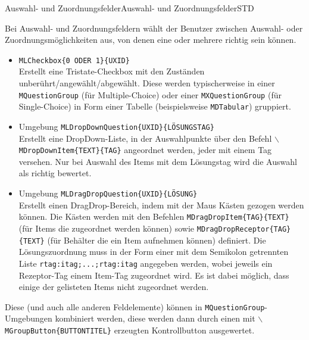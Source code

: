 
\begin{MXContent}{Auswahl- und Zuordnungsfelder}{Auswahl- und Zuordnungsfelder}{STD}

\begin{MInfo}
Bei Auswahl- und Zuordnungsfeldern wählt der Benutzer zwischen Auswahl- oder Zuordnungsmöglichkeiten aus, von denen eine oder mehrere richtig sein können.
\ \\
\begin{itemize}
\item{\texttt{MLCheckbox\{0 ODER 1\}\{UXID\}}\\
Erstellt eine Tristate-Checkbox mit den Zuständen unberührt/angewählt/abgewählt. Diese werden typischerweise in einer \texttt{MQuestionGroup} (für Multiple-Choice)
oder einer \texttt{MXQuestionGroup} (für Single-Choice) in Form einer Tabelle (beispielsweise \texttt{MDTabular}) gruppiert.}
\item{Umgebung \texttt{MLDropDownQuestion\{UXID\}\{LÖSUNGSTAG\}}\\
Erstellt eine DropDown-Liste, in der Auswahlpunkte über den Befehl \texttt{$\backslash$MDropDownItem\{TEXT\}\{TAG\}} angeordnet werden, jeder mit einem Tag versehen.
Nur bei Auswahl des Items mit dem Lösungstag wird die Auswahl als richtig bewertet.}
\item{Umgebung \texttt{MLDragDropQuestion\{UXID\}\{LÖSUNG\}}\\
Erstellt einen DragDrop-Bereich, indem mit der Maus Kästen gezogen werden können.
Die Kästen werden mit den Befehlen \texttt{MDragDropItem\{TAG\}\{TEXT\}} (für Items die zugeordnet werden können) sowie
\texttt{MDragDropReceptor\{TAG\}\{TEXT\}} (für Behälter die ein Item aufnehmen können) definiert.
Die Lösungszuordnung muss in der Form einer mit dem Semikolon getrennten Liste \texttt{rtag:itag;...;rtag:itag} angegeben werden,
wobei jeweils ein Rezeptor-Tag einem Item-Tag zugeordnet wird. Es ist dabei möglich, dass einige der gelisteten Items nicht zugeordnet werden.}
\end{itemize}

Diese (und auch alle anderen Feldelemente) können in \texttt{MQuestionGroup}-Umgebungen kombiniert werden,
diese werden dann durch einen mit \texttt{$\backslash$MGroupButton\{BUTTONTITEL\}} erzeugten Kontrollbutton ausgewertet.
\end{MInfo}


\end{MXContent}
